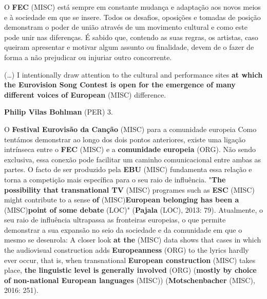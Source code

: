 \documentclass[12pt,a4paper]{article}
\begin{document}
O  \textbf{FEC} (MISC)  está  sempre  em  constante  mudança  e  adaptação  aos  novos  meios  e  à sociedade  em  que  se  insere.  Todos  os  desafios,  oposições  e  tomadas  de  posição demonstram o poder de união através de um movimento cultural e como este pode unir nas diferenças. É sabido que, contendo as suas regras, os artistas, caso queiram apresentar e motivar algum assunto ou finalidade, devem de o fazer de forma a não prejudicar ou injuriar outro concorrente.

(…) I intentionally draw attention to the cultural and performance sites \textbf{at which the Eurovision Song Contest is open for the emergence of many different voices of European} (MISC) difference.

\textbf{Philip Vilas Bohlman} (PER) 3.

O \textbf{Festival Eurovisão da Canção} (MISC) para a comunidade europeia Como  tentámos  demonstrar  ao  longo  dos  dois  pontos  anteriores,  existe  uma ligação  intrínseca  entre  o  \textbf{FEC} (MISC)  e  a  \textbf{comunidade  europeia} (ORG).  Não  sendo  exclusiva,  essa conexão pode facilitar um caminho comunicacional entre ambas as partes. O facto de ser produzido pela \textbf{EBU} (MISC) fundamenta essa relação e torna a competição mais específica para o seu raio de influência. "\textbf{The possibility that transnational TV} (MISC) programes such as \textbf{ESC} (MISC) might  contribute  to  a  sense  \textbf{of} (MISC)\textbf{European  belonging  has  been  a} (MISC)\textbf{point  of  some  debate} (LOC)" (\textbf{Pajala} (LOC), 2013: 79). Atualmente, o seu raio de influência ultrapassa as fronteiras europeias, o que permite demonstrar a sua expansão no seio da sociedade e da comunidade em que o mesmo se desenrola: A  closer  look  \textbf{at  the} (MISC)  data  shows  that  cases  in  which  the  audiovisual  construction  adds \textbf{Europeanness} (ORG)  to  the  lyrics  hardly  ever  occur,  that  is,  when  transnational  \textbf{European construction} (MISC) takes place, \textbf{the linguistic level is generally involved} (ORG) (\textbf{mostly by choice  of non-national European languages} (MISC)) (\textbf{Motschenbacher} (MISC), 2016: 251).
\end{document}
